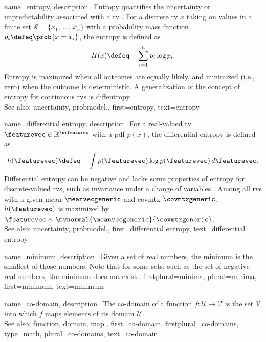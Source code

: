 {name={entropy},
	description={Entropy quantifies the \gls{uncertainty} or unpredictability associated with a \gls{rv} \cite{coverthomas}. 
		For a discrete \gls{rv} $x$ taking on values in a finite set $\mathcal{S} = \{x_1, \,\ldots, \,x_n\}$ with 
		a \gls{probability} mass \gls{function} $p_i \defeq \prob{x = x_i}$, the entropy is defined as
		\[
		H(x) \defeq -\sum_{i=1}^n p_i \log p_i.
		\]
		Entropy is maximized when all outcomes are equally likely, and minimized (i.e., zero) 
		when the outcome is deterministic. A \gls{generalization} of the concept of entropy for continuous 
		\glspl{rv} is \gls{diffentropy}. 
		\\
		See also: \gls{uncertainty}, \gls{probmodel}.},
	first={entropy},
	text={entropy}
}

{name={differential entropy},
	description={For a real-valued \gls{rv} $\featurevec \in \mathbb{R}^{\nrfeatures}$ 
		with a \gls{pdf} $p(x)$, the differential \gls{entropy} is defined as \cite{coverthomas}
		\[
		h(\featurevec) \defeq - \int p(\featurevec) \log p(\featurevec) \, d\featurevec.
		\]
		Differential \gls{entropy} can be negative and lacks some properties of \gls{entropy} for 
		discrete-valued \glspl{rv}, such as invariance under a change of variables \cite{coverthomas}. 
		Among all \glspl{rv} with a given \gls{mean} $\meanvecgeneric$ and \gls{covmtx} $\covmtxgeneric$, 
		$h(\featurevec)$ is maximized by $\featurevec \sim \mvnormal{\meanvecgeneric}{\covmtxgeneric}$. 
		\\
		See also: \gls{uncertainty}, \gls{probmodel}.},
	first={differential entropy},
	text={differential entropy}
}

{name={minimum},
	description={Given a set of real numbers, the minimum is the smallest of those numbers.
		Note that for some sets, such as the set of negative real numbers, the minimum does not exist.},
	firstplural={minima}, 
 	plural={minima},
	first={minimum},
	text={minimum}
}


{name={co-domain}, 
	description={The co-domain of a \gls{function} 
	$f: \mathcal{U} \rightarrow \mathcal{V}$ is the set $\mathcal{V}$ 
		into which $f$ maps elements of its domain $\mathcal{U}$.  
		\\
		See also: \gls{function}, \gls{domain}, \gls{map}.},
	first={co-domain},
	firstplural={co-domains}, 
	type=math, 
	plural={co-domains},
	text={co-domain}
}


